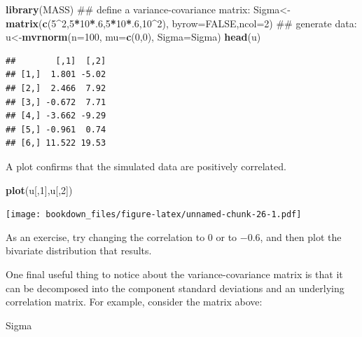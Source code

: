 \documentclass[12pt,]{krantz}
\newenvironment{Shaded}{\begin{snugshade}}{\end{snugshade}}
\newcommand{\KeywordTok}[1]{\textcolor[rgb]{0.13,0.29,0.53}{\textbf{#1}}}
\newcommand{\DataTypeTok}[1]{\textcolor[rgb]{0.13,0.29,0.53}{#1}}
\newcommand{\DecValTok}[1]{\textcolor[rgb]{0.00,0.00,0.81}{#1}}
\newcommand{\OtherTok}[1]{\textcolor[rgb]{0.56,0.35,0.01}{#1}}
\newcommand{\OperatorTok}[1]{\textcolor[rgb]{0.81,0.36,0.00}{\textbf{#1}}}
\newcommand{\NormalTok}[1]{#1}
\theoremstyle{definition}
\theoremstyle{definition}
\theoremstyle{definition}
\theoremstyle{remark}
\begin{document}
\begin{Shaded}
\begin{Highlighting}[]
\KeywordTok{library}\NormalTok{(MASS)}
\NormalTok{## define a variance-covariance matrix:}
\NormalTok{Sigma<-}\KeywordTok{matrix}\NormalTok{(}\KeywordTok{c}\NormalTok{(}\DecValTok{5}\OperatorTok{^}\DecValTok{2}\NormalTok{,}\DecValTok{5}\OperatorTok{*}\DecValTok{10}\OperatorTok{*}\NormalTok{.}\DecValTok{6}\NormalTok{,}\DecValTok{5}\OperatorTok{*}\DecValTok{10}\OperatorTok{*}\NormalTok{.}\DecValTok{6}\NormalTok{,}\DecValTok{10}\OperatorTok{^}\DecValTok{2}\NormalTok{),}
              \DataTypeTok{byrow=}\OtherTok{FALSE}\NormalTok{,}\DataTypeTok{ncol=}\DecValTok{2}\NormalTok{)}
\NormalTok{## generate data:}
\NormalTok{u<-}\KeywordTok{mvrnorm}\NormalTok{(}\DataTypeTok{n=}\DecValTok{100}\NormalTok{,}
           \DataTypeTok{mu=}\KeywordTok{c}\NormalTok{(}\DecValTok{0}\NormalTok{,}\DecValTok{0}\NormalTok{),}
           \DataTypeTok{Sigma=}\NormalTok{Sigma)}
\KeywordTok{head}\NormalTok{(u)}
\end{Highlighting}
\end{Shaded}

\begin{verbatim}
##        [,1]  [,2]
## [1,]  1.801 -5.02
## [2,]  2.466  7.92
## [3,] -0.672  7.71
## [4,] -3.662 -9.29
## [5,] -0.961  0.74
## [6,] 11.522 19.53
\end{verbatim}

A plot confirms that the simulated data are positively correlated.

\begin{Shaded}
\begin{Highlighting}[]
\KeywordTok{plot}\NormalTok{(u[,}\DecValTok{1}\NormalTok{],u[,}\DecValTok{2}\NormalTok{])}
\end{Highlighting}
\end{Shaded}

\texttt{[image: bookdown\_files/figure-latex/unnamed-chunk-26-1.pdf]}

As an exercise, try changing the correlation to \(0\) or to \(-0.6\),
and then plot the bivariate distribution that results.

One final useful thing to notice about the variance-covariance matrix is
that it can be decomposed into the component standard deviations and an
underlying correlation matrix. For example, consider the matrix above:

\begin{Shaded}
\begin{Highlighting}[]
\NormalTok{Sigma}
\end{Highlighting}
\end{Shaded}
\end{document}
